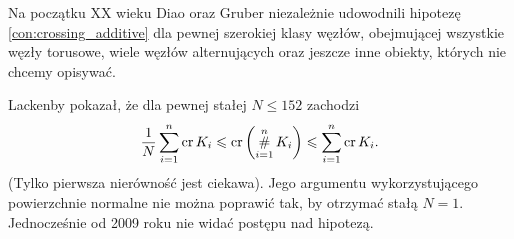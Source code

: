 Na początku XX wieku Diao \cite{diao2004} oraz Gruber \cite{gruber2003} niezależnie udowodnili hipotezę \ref{con:crossing_additive} dla pewnej szerokiej klasy węzłów, obejmującej wszystkie węzły torusowe, wiele węzłów alternujących oraz jeszcze inne obiekty, których nie chcemy opisywać.
%
%
%

Lackenby \cite{lackenby2009} pokazał, że dla pewnej stałej $N \le 152$ zachodzi
\begin{equation}
    \frac 1 N \sum_{i=1}^n \operatorname{cr}{K_i} \leqslant \operatorname{cr} \left(\operatorname*{\#}_{i=1}^n K_i\right) \leqslant \sum_{i=1}^n \operatorname{cr}{K_i}.
\end{equation}
(Tylko pierwsza nierówność jest ciekawa).
Jego argumentu wykorzystującego powierzchnie normalne nie można poprawić tak, by otrzymać stałą $N = 1$.
Jednocześnie od 2009 roku nie widać postępu nad hipotezą.

%


